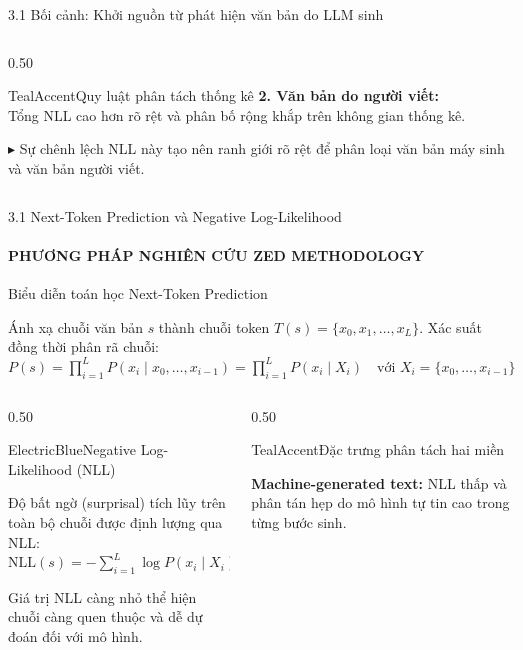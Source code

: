 \documentclass[aspectratio=169, 10pt, t]{beamer}
\begin{document}
\begin{frame}{3.1 Bối cảnh: Khởi nguồn từ phát hiện văn bản do LLM sinh}
\begin{columns}[t]
\begin{column}{0.50\textwidth}
\begin{accentbox}[equal height group=ctx]{TealAccent}{Quy luật phân tách thống kê}
        \textbf{2. Văn bản do người viết:}\\
        Tổng NLL cao hơn rõ rệt và phân bố rộng khắp trên không gian thống kê.
        \vspace{0.35em}

        $\blacktriangleright$ Sự chênh lệch NLL này tạo nên ranh giới rõ rệt để phân loại văn bản máy sinh và văn bản người viết.
      \end{accentbox}
    \end{column}
  \end{columns}
\end{frame}

\begin{frame}{3.1 Next-Token Prediction và Negative Log-Likelihood}
  \framesubtitle{PHƯƠNG PHÁP NGHIÊN CỨU \;\textbar\; ZED METHODOLOGY}
  \begin{cleanbox}{Biểu diễn toán học Next-Token Prediction}
    \raggedright\scriptsize
    Ánh xạ chuỗi văn bản $s$ thành chuỗi token $T(s) = \{x_0, x_1, \dots, x_L\}$. Xác suất đồng thời phân rã chuỗi:
    \\[0.15em]
    \centering
    $\textstyle P(s) = \prod_{i=1}^L P(x_i \mid x_0, \dots, x_{i-1}) = \prod_{i=1}^L P(x_i \mid X_i) \quad \text{với } X_i = \{x_0, \dots, x_{i-1}\}$
  \end{cleanbox}

  \vspace{0.15em}
  \begin{columns}[t]
    \begin{column}{0.50\textwidth}
      \begin{accentbox}[equal height group=math]{ElectricBlue}{Negative Log-Likelihood (NLL)}
        \raggedright\scriptsize
        Độ bất ngờ (surprisal) tích lũy trên toàn bộ chuỗi được định lượng qua NLL:
        \\[0.20em]
        \centering
        $\textstyle \text{NLL}(s) = -\sum_{i=1}^L \log P(x_i \mid X_i)$
        \vspace{0.15em}
        \raggedright
        Giá trị NLL càng nhỏ thể hiện chuỗi càng quen thuộc và dễ dự đoán đối với mô hình.
      \end{accentbox}
    \end{column}
    \begin{column}{0.50\textwidth}
      \begin{accentbox}[equal height group=math]{TealAccent}{Đặc trưng phân tách hai miền}
        \raggedright\scriptsize
        \textbf{Machine-generated text:} NLL thấp và phân tán hẹp do mô hình tự tin cao trong từng bước sinh.
        \vspace{0.25em}


\end{accentbox}
\end{column}
\end{columns}
\end{frame}
\end{document}
